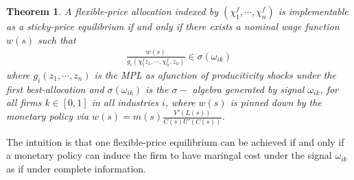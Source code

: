 \documentclass[12pt]{article}
\newtheorem{theorem}{Theorem}
\numberwithin{equation}{section}
\begin{document}
\begin{theorem}
    A flexible-price allocation indexed by $(\chi_1^f, \cdots, \chi_n^f)$ is implementable as a sticky-price equilibrium if and only if there exists a nominal wage function $w(s)$ such that
    \begin{align}\label{eq:cond_flex_implement_sticky}
        \frac{w(s)}{g_i(\chi_1^f z_1, \cdots, \chi_n^f, z_n)} \in \sigma(\omega_{ik})
    \end{align}
    where $g_i(z_1, \cdots, z_n)$ is the MPL as afunction of producitivity shocks under the first best-allocation and $\sigma(\omega_{ik})$ is the $\sigma-$ algebra generated by signal $\omega_{ik}$, for all firms $k\in[0,1]$ in all industries $i$, where $w(s)$ is pinned down by the monetary policy via $w(s) = m(s) \frac{V'(L(s))}{C(s) U'(C(s))}$.
\end{theorem}
The intuition is that one flexible-price equilibrium can be achieved if and only if a monetary policy can induce the firm to have maringal cost under the signal $\omega_{ik}$ as if under complete information. 
\end{document}
